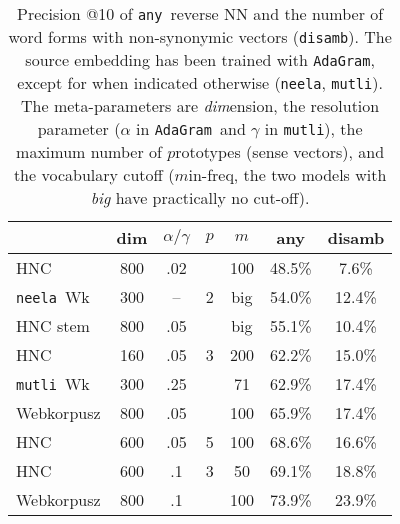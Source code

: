 \documentclass[11pt]{article}
\newcommand{\neelakantan}{\texttt{neela}}
\newcommand{\adagram}{\texttt{AdaGram}}
\newcommand{\mutli}{\texttt{mutli}}
\newcommand{\any}{\texttt{any}}
\newcommand{\disamb}{\texttt{disamb}}
\begin{document}
\begin{table}
  \centering\small
    \begin{tabular}{lcccc|cc}
      \toprule
        & dim & $\alpha/\gamma$ & $p$ & $m$ & any & disamb \\
      \midrule
      HNC	        & 800	& .02	&       & 100   & 48.5\%	&  7.6\% \\
      \neelakantan~Wk&300&--&2   &big  & 54.0\%	&  12.4\% \\
      HNC stem & 800	& .05	&       &  big & 55.1\%	&  10.4\% \\
      HNC         & 160 & .05 & 3     & 200   & 62.2\%	&  15.0\% \\
      \mutli~Wk &300&.25 &       & 71    & 62.9\%	&  17.4\% \\
      Webkorpusz	    & 800	& .05	&       & 100	  & 65.9\%	&  17.4\% \\
      HNC	        & 600	& .05	& 5     & 100	  & 68.6\%	&  16.6\% \\
      HNC	        & 600	& .1  & 3     & 50	  & 69.1\%	&  18.8\% \\
      Webkorpusz	    & 800	& .1  &       & 100	  & 73.9\%	&  23.9\% \\
      \bottomrule
    \end{tabular}
  \caption{Precision @10 of \any~reverse NN and the number of word forms with
  non-synonymic vectors (\disamb).  The source embedding has been trained with
  \adagram, except for when indicated otherwise (\neelakantan,
  \mutli).  
  The meta-parameters are \emph{dim}ension, the
  resolution parameter ($\alpha$ in \adagram~and $\gamma$ in \mutli), the
  maximum number of $p$rototypes (sense vectors), and the vocabulary cutoff
  ($m$in-freq, the two models with \emph{big} have practically no cut-off).}
    \label{tab:prec}
\end{table}
\end{document}
